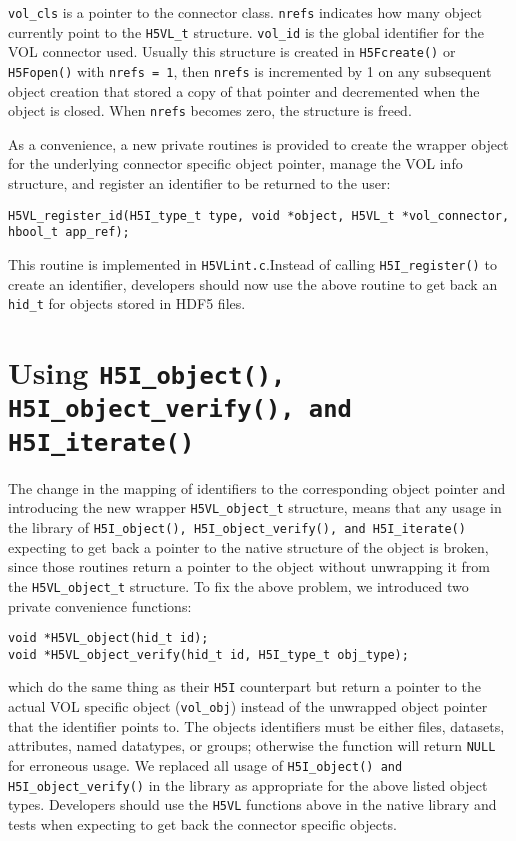 {\tt vol\_cls} is a pointer to the connector class. {\tt nrefs} indicates how many object currently point to the {\tt H5VL\_t} structure. {\tt vol\_id} is the global identifier for the VOL connector used. Usually this structure is created in {\tt H5Fcreate()} or {\tt H5Fopen()} with {\tt nrefs = 1}, then {\tt nrefs} is incremented by 1 on any subsequent object creation that stored a copy of that pointer and decremented when the object is closed. When {\tt nrefs} becomes zero, the structure is freed. 

As a convenience, a new private routines is provided to create the wrapper object for the underlying connector specific object pointer, manage the VOL info structure, and register an identifier to be returned to the user:

\begin{lstlisting}
H5VL_register_id(H5I_type_t type, void *object, H5VL_t *vol_connector, hbool_t app_ref);
\end{lstlisting}

This routine is implemented in {\tt H5VLint.c}.Instead of calling {\tt H5I\_register()} to create an identifier, developers should now use the above routine to get back an {\tt hid\_t} for objects stored in HDF5 files.

\section{Using {\tt H5I\_object(), H5I\_object\_verify(), and H5I\_iterate()}}
The change in the mapping of identifiers to the corresponding object pointer and introducing the new wrapper {\tt H5VL\_object\_t} structure, means that any usage in the library of {\tt H5I\_object(), H5I\_object\_verify(), and H5I\_iterate()} expecting to get back a pointer to the native structure of the object is broken, since those routines return a pointer to the object without unwrapping it from the {\tt H5VL\_object\_t} structure. To fix the above problem, we introduced two private convenience functions:
\begin{lstlisting}
void *H5VL_object(hid_t id);
void *H5VL_object_verify(hid_t id, H5I_type_t obj_type);
\end{lstlisting}

which do the same thing as their {\tt H5I} counterpart but return a pointer to the actual VOL specific object ({\tt vol\_obj}) instead of the unwrapped object pointer that the identifier points to. The objects identifiers must be either files, datasets, attributes, named datatypes, or groups; otherwise the function will return {\tt NULL} for erroneous usage. We replaced all usage of {\tt H5I\_object() and H5I\_object\_verify()} in the library as appropriate for the above listed object types. Developers should use the {\tt H5VL} functions above in the native library and tests when expecting to get back the connector specific objects.

